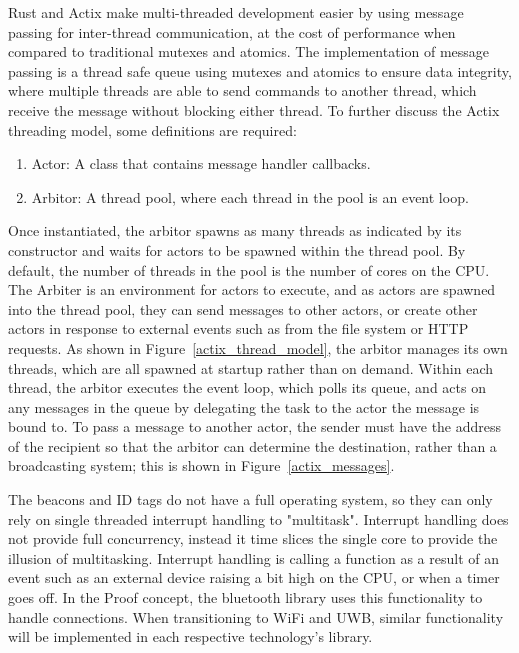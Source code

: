 \bigskip
Rust and Actix make multi-threaded development easier by using message passing for inter-thread communication, at the cost of performance when compared to traditional mutexes and atomics.
The implementation of message passing is a thread safe queue using mutexes and atomics to ensure data integrity, where multiple threads are able to send commands to another thread, which receive the message without blocking either thread.
To further discuss the Actix threading model, some definitions are required:
\begin{enumerate}
	\item Actor: A class that contains message handler callbacks.
	\item Arbitor: A thread pool, where each thread in the pool is an event loop.
\end{enumerate}
Once instantiated, the arbitor spawns as many threads as indicated by its constructor and waits for actors to be spawned within the thread pool.
By default, the number of threads in the pool is the number of cores on the CPU.
The \Gls{Arbiter} is an environment for actors to execute, and as actors are spawned into the thread pool, they can send messages to other actors, or create other actors in response to external events such as from the file system or HTTP requests.
As shown in Figure~\ref{actix_thread_model}, the arbitor manages its own threads, which are all spawned at startup rather than on demand.
Within each thread, the arbitor executes the event loop, which polls its queue, and acts on any messages in the queue by delegating the task to the actor the message is bound to.
To pass a message to another actor, the sender must have the address of the recipient so that the arbitor can determine the destination, rather than a broadcasting system; this is shown in Figure~\ref{actix_messages}. 

\bigskip
The beacons and ID tags do not have a full operating system, so they can only rely on single threaded interrupt handling to "multitask".
Interrupt handling does not provide full concurrency, instead it time slices the single core to provide the illusion of multitasking.
Interrupt handling is calling a function as a result of an event such as an external device raising a bit high on the CPU, or when a timer goes off.
In the Proof concept, the bluetooth library uses this functionality to handle connections. When transitioning to WiFi and UWB, similar functionality will be implemented in each respective technology's library.

